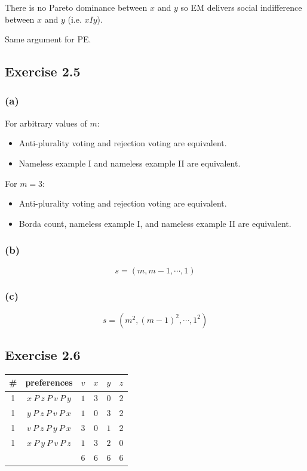 \documentclass[a4paper]{article}
\begin{document}
There is no Pareto dominance between $x$ and $y$ so EM delivers social indifference between $x$ and $y$ (i.e. $xIy$).

Same argument for PE.

\subsection*{Exercise 2.5}

\subsubsection*{(a)}

For arbitrary values of $m$:
\begin{itemize}
    \item Anti-plurality voting and rejection voting are equivalent.
    \item Nameless example I and nameless example II are equivalent.
\end{itemize}

For $m=3$:
\begin{itemize}
    \item Anti-plurality voting and rejection voting are equivalent.
    \item Borda count, nameless example I, and nameless example II are equivalent.
\end{itemize}

\subsubsection*{(b)}

\[s=(m, m-1, \cdots, 1) \]

\subsubsection*{(c)}

\[s=(m^2, (m-1)^2, \cdots, 1^2) \]

\subsection*{Exercise 2.6}

\begin{table}[!htbp]
    \centering
    \begin{tabular}{c|c|cccc|}
        \# & preferences                  & $v$  & $x$  & $y$  & $z$ \\ 
        \hline
        1  & $x\: P\: z\: P\: v\: P\: y$  & $1$  & $3$  & $0$  & $2$ \\
        1  & $y\: P\: z\: P\: v\: P\: x$  & $1$  & $0$  & $3$  & $2$ \\
        1  & $v\: P\: z\: P\: y\: P\: x$  & $3$  & $0$  & $1$  & $2$ \\
        1  & $x\: P\: y\: P\: v\: P\: z$  & $1$  & $3$  & $2$  & $0$ \\
        \hline
           &                              & $6$ & $6$  & $6$  & $6$ \\
        \hline
    \end{tabular}
\end{table}
\end{document}
